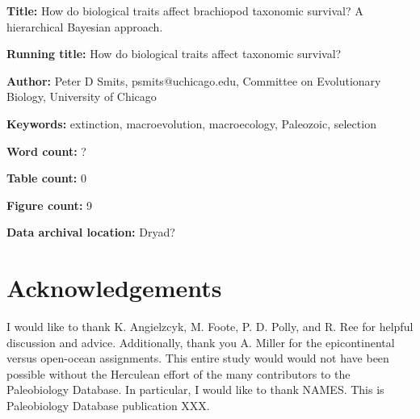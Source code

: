 \documentclass{article}
\begin{document}
\linenumbers
\modulolinenumbers[2]


\begin{titlepage}
  \begin{large}
    \textbf{Title:} How do biological traits affect brachiopod taxonomic survival? A hierarchical Bayesian approach.
  \end{large}

  \textbf{Running title:} How do biological traits affect taxonomic survival?

  \textbf{Author:} Peter D Smits, psmits@uchicago.edu, Committee on Evolutionary Biology, University of Chicago

  \textbf{Keywords:} extinction, macroevolution, macroecology, Paleozoic, selection

  \textbf{Word count:} ?
  
  \textbf{Table count:} 0
 
  \textbf{Figure count:} 9

  \textbf{Data archival location:} Dryad?

\end{titlepage}











\section*{Acknowledgements}
I would like to thank K. Angielzcyk, M. Foote, P. D. Polly, and R. Ree for helpful discussion and advice. Additionally, thank you A. Miller for the epicontinental versus open-ocean assignments. This entire study would would not have been possible without the Herculean effort of the many contributors to the Paleobiology Database. In particular, I would like to thank NAMES. This is Paleobiology Database publication XXX.

\clearpage




\clearpage

\appendix

\end{document}
